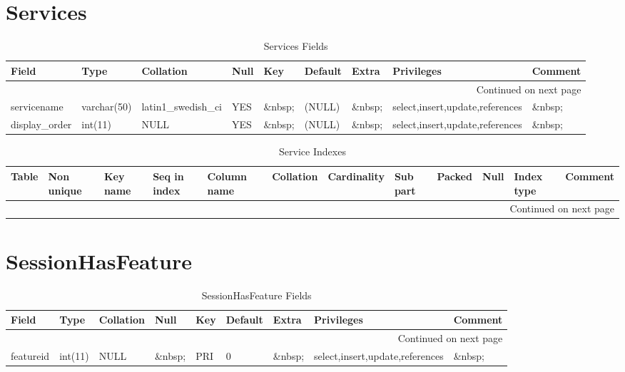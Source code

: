 \documentclass[tablesignature]{scrartcl}
\begin{document}
\section{Services}
\label{sec-25}


\begin{longtable}{|l|l|l|l|l|l|l|l|l|}
\caption{Services Fields} \label{tbl:servicesfields}\\
\hline
 Field             &  Type         &  Collation                &  Null     &  Key      &  Default  &  Extra              &  Privileges                       &  Comment \\
\hline
\endhead
\hline\multicolumn{9}{r}{Continued on next page}\
\endfoot
\endlastfoot
\hline
 serviceid         &  int(11)      &  NULL                     &  \&nbsp;  &  PRI      &  (NULL)   &  auto\_{}increment  &  select,insert,update,references  &  \&nbsp;  \\
 servicename       &  varchar(50)  &  latin1\_{}swedish\_{}ci  &  YES      &  \&nbsp;  &  (NULL)   &  \&nbsp;            &  select,insert,update,references  &  \&nbsp;  \\
 display\_{}order  &  int(11)      &  NULL                     &  YES      &  \&nbsp;  &  (NULL)   &  \&nbsp;            &  select,insert,update,references  &  \&nbsp;  \\
\hline
\end{longtable}


\begin{longtable}{|l|l|l|l|l|l|l|l|l|l|l|l|}
\caption{Service Indexes} \label{tbl:serviceindexes}\\
\hline
 Table     &  Non unique  &  Key name  &  Seq in index  &  Column name  &  Collation  &  Cardinality  &  Sub part  &  Packed  &  Null     &  Index type  &  Comment \\
\hline
\endhead
\hline\multicolumn{12}{r}{Continued on next page}\
\endfoot
\endlastfoot
\hline
 Services  &           0  &  PRIMARY   &             1  &  serviceid    &  A          &           14  &  (NULL)    &  (NULL)  &  \&nbsp;  &  BTREE       &  \&nbsp;  \\
\hline
\end{longtable}
\section{SessionHasFeature}
\label{sec-26}


\begin{longtable}{|l|l|l|l|l|l|l|l|l|}
\caption{SessionHasFeature Fields} \label{tbl:sessionhasfeaturefields}\\
\hline
 Field      &  Type     &  Collation  &  Null     &  Key  &  Default  &  Extra    &  Privileges                       &  Comment \\
\hline
\endhead
\hline\multicolumn{9}{r}{Continued on next page}\
\endfoot
\endlastfoot
\hline
 sessionid  &  int(11)  &  NULL       &  \&nbsp;  &  PRI  &        0  &  \&nbsp;  &  select,insert,update,references  &  \&nbsp;  \\
 featureid  &  int(11)  &  NULL       &  \&nbsp;  &  PRI  &        0  &  \&nbsp;  &  select,insert,update,references  &  \&nbsp;  \\
\hline
\end{longtable}
\end{document}

